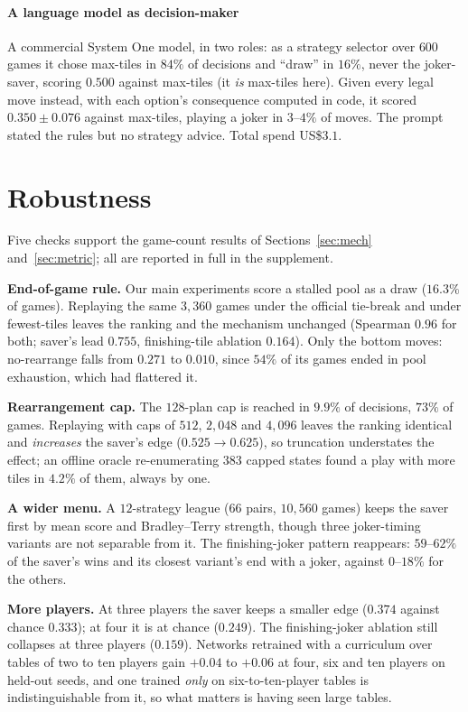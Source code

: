 \documentclass[10pt,journal,compsoc]{IEEEtran}
\begin{document}
\paragraph*{A language model as decision-maker}
A commercial System One model, in two roles: as a strategy selector over $600$ games it chose max-tiles in $84\%$ of decisions and ``draw'' in $16\%$, never the joker-saver, scoring $0.500$ against max-tiles (it \emph{is} max-tiles here). Given every legal move instead, with each option's consequence computed in code, it scored $0.350\pm0.076$ against max-tiles, playing a joker in $3$--$4\%$ of moves. The prompt stated the rules but no strategy advice. Total spend US\$$3.1$.

\section{Robustness}\label{sec:rob}
Five checks support the game-count results of Sections~\ref{sec:mech} and~\ref{sec:metric}; all are reported in full in the supplement.

\textbf{End-of-game rule.} Our main experiments score a stalled pool as a draw ($16.3\%$ of games). Replaying the same $3{,}360$ games under the official tie-break and under fewest-tiles leaves the ranking and the mechanism unchanged (Spearman $0.96$ for both; saver's lead $0.755$, finishing-tile ablation $0.164$). Only the bottom moves: no-rearrange falls from $0.271$ to $0.010$, since $54\%$ of its games ended in pool exhaustion, which had flattered it.

\textbf{Rearrangement cap.} The $128$-plan cap is reached in $9.9\%$ of decisions, $73\%$ of games. Replaying with caps of $512$, $2{,}048$ and $4{,}096$ leaves the ranking identical and \emph{increases} the saver's edge ($0.525\to0.625$), so truncation understates the effect; an offline oracle re-enumerating $383$ capped states found a play with more tiles in $4.2\%$ of them, always by one.

\textbf{A wider menu.} A $12$-strategy league ($66$ pairs, $10{,}560$ games) keeps the saver first by mean score and Bradley--Terry strength, though three joker-timing variants are not separable from it. The finishing-joker pattern reappears: $59$--$62\%$ of the saver's wins and its closest variant's end with a joker, against $0$--$18\%$ for the others.

\textbf{More players.} At three players the saver keeps a smaller edge ($0.374$ against chance $0.333$); at four it is at chance ($0.249$). The finishing-joker ablation still collapses at three players ($0.159$). Networks retrained with a curriculum over tables of two to ten players gain $+0.04$ to $+0.06$ at four, six and ten players on held-out seeds, and one trained \emph{only} on six-to-ten-player tables is indistinguishable from it, so what matters is having seen large tables.
\end{document}
